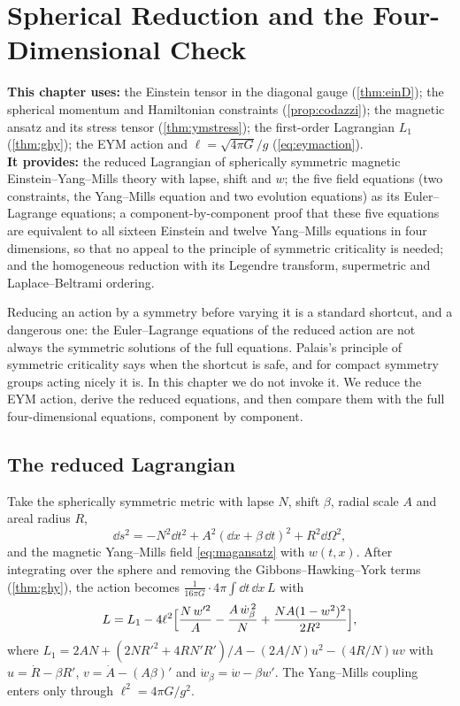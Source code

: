 \chapter{Spherical Reduction and the Four-Dimensional Check}
\label{ch:reduction}

\begin{usesbox}
\textbf{This chapter uses:} the Einstein tensor in the diagonal gauge (\cref{thm:einD}); the spherical momentum and Hamiltonian constraints (\cref{prop:codazzi}); the magnetic ansatz and its stress tensor (\cref{thm:ymstress}); the first-order Lagrangian $L_1$ (\cref{thm:ghy}); the EYM action and $\ell=\sqrt{4\pi G}/g$ (\eqref{eq:eymaction}).\\
\textbf{It provides:} the reduced Lagrangian of spherically symmetric magnetic Einstein--Yang--Mills theory with lapse, shift and $w$; the five field equations (two constraints, the Yang--Mills equation and two evolution equations) as its Euler--Lagrange equations; a component-by-component proof that these five equations are equivalent to all sixteen Einstein and twelve Yang--Mills equations in four dimensions, so that no appeal to the principle of symmetric criticality is needed; and the homogeneous reduction with its Legendre transform, supermetric and Laplace--Beltrami ordering.
\end{usesbox}

Reducing an action by a symmetry before varying it is a standard shortcut, and a dangerous one: the Euler--Lagrange equations of the reduced action are not always the symmetric solutions of the full equations. Palais's principle of symmetric criticality \cite{Palais1979} says when the shortcut is safe, and for compact symmetry groups acting nicely it is. In this chapter we do not invoke it. We reduce the EYM action, derive the reduced equations, and then compare them with the full four-dimensional equations, component by component.

\section{The reduced Lagrangian}

Take the spherically symmetric metric with lapse $N$, shift $\beta$, radial scale $A$ and areal radius $R$,
\[
\dd s^2=-N^2\dd t^2+A^2(\dd x+\beta\,\dd t)^2+R^2\dd\Omega^2,
\]
and the magnetic Yang--Mills field \eqref{eq:magansatz} with $w(t,x)$. After integrating over the sphere and removing the Gibbons--Hawking--York terms (\cref{thm:ghy}), the action becomes $\frac1{16\pi G}\cdot4\pi\int\dd t\,\dd x\,L$ with
\begin{equation}\label{eq:reducedL}
L=L_1-4\ell^2\Bigl[\frac{N\,w'^2}{A}-\frac{A\,\dot w_\beta^{\,2}}{N}+\frac{NA(1-w^2)^2}{2R^2}\Bigr],
\end{equation}
where $L_1=2AN+(2NR'^2+4RN'R')/A-(2A/N)u^2-(4R/N)uv$ with $u=\dot R-\beta R'$, $v=\dot A-(A\beta)'$ and $\dot w_\beta=\dot w-\beta w'$. The Yang--Mills coupling enters only through $\ell^2=4\pi G/g^2$.

